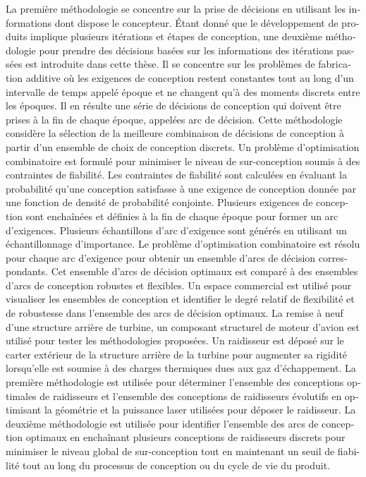 \documentclass[12pt,Bold,letterpaper,TexShade,twoside]{mcgilletdclass}
\begin{document}
\begin{romanPagenumber}{2}
\begin{otherlanguage}{french}
{La première méthodologie se concentre sur la prise de décisions en utilisant les informations dont dispose le concepteur. Étant donné que le développement de produits implique plusieurs itérations et étapes de conception, une deuxième méthodologie pour prendre des décisions basées sur les informations des itérations passées est introduite dans cette thèse. Il se concentre sur les problèmes de fabrication additive où les exigences de conception restent constantes tout au long d'un intervalle de temps appelé époque et ne changent qu'à des moments discrets entre les époques. Il en résulte une série de décisions de conception qui doivent être prises à la fin de chaque époque, appelées arc de décision. Cette méthodologie considère la sélection de la meilleure combinaison de décisions de conception à partir d'un ensemble de choix de conception discrets. Un problème d'optimisation combinatoire est formulé pour minimiser le niveau de sur-conception soumis à des contraintes de fiabilité. Les contraintes de fiabilité sont calculées en évaluant la probabilité qu'une conception satisfasse à une exigence de conception donnée par une fonction de densité de probabilité conjointe. Plusieurs exigences de conception sont enchaînées et définies à la fin de chaque époque pour former un arc d'exigences. Plusieurs échantillons d'arc d'exigence sont générés en utilisant un échanti\-llonnage d'importance. Le problème d'optimisation combinatoire est résolu pour chaque arc d'exi\-gence pour obtenir un ensemble d'arcs de décision correspondants. Cet ensemble d'arcs de décision optimaux est comparé à des ensembles d'arcs de conception robustes et flexibles. Un espace commercial est utilisé pour visualiser les ensembles de conception et identifier le degré relatif de flexibilité et de robustesse dans l'ensemble des arcs de décision optimaux.
La remise à neuf d'une structure arrière de turbine, un composant structurel de moteur d'avion est utilisé pour tester les méthodologies proposées. Un raidisseur est déposé sur le carter extérieur de la structure arrière de la turbine pour augmenter sa rigidité lorsqu'elle est soumise à des charges thermiques dues aux gaz d'échappement. La première méthodologie est utilisée pour déterminer l'ensemble des conceptions optimales de raidisseurs et l'ensemble des conceptions de raidisseurs évolutifs en optimisant la géométrie et la puissance laser utilisées pour déposer le raidisseur. La deuxième méthodologie est utilisée pour identifier l’ensemble des arcs de conception optimaux en enchaînant plusieurs conceptions de raidisseurs discrets pour minimiser le niveau global de sur-conception tout en maintenant un seuil de fiabilité tout au long du processus de conception ou du cycle de vie du produit.
}
\end{otherlanguage}
\end{romanPagenumber}
\end{document}
